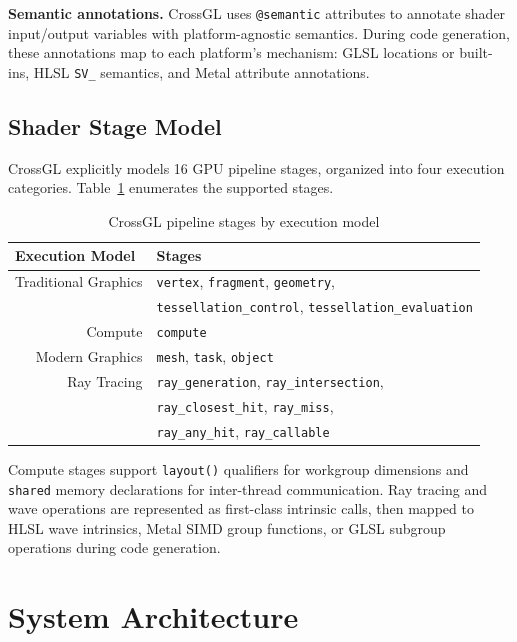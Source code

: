 \documentclass{svproc}
\begin{document}
\textbf{Semantic annotations.} CrossGL uses \texttt{@semantic} attributes to annotate shader input/output variables with platform-agnostic semantics. During code generation, these annotations map to each platform's mechanism: GLSL locations or built-ins, HLSL \texttt{SV\_} semantics, and Metal attribute annotations.

\subsection{Shader Stage Model}

CrossGL explicitly models 16 GPU pipeline stages, organized into four execution categories. Table~\ref{tab:stages} enumerates the supported stages.

\begin{table}
\caption{CrossGL pipeline stages by execution model}
\label{tab:stages}
\begin{center}
\begin{tabular}{r@{\quad}l}
\hline
\multicolumn{1}{l}{\rule{0pt}{12pt}\textbf{Execution Model}} & \textbf{Stages} \\[2pt]
\hline\rule{0pt}{12pt}
Traditional Graphics & \texttt{vertex}, \texttt{fragment}, \texttt{geometry}, \\
& \texttt{tessellation\_control}, \texttt{tessellation\_evaluation} \\
Compute & \texttt{compute} \\
Modern Graphics & \texttt{mesh}, \texttt{task}, \texttt{object} \\
Ray Tracing & \texttt{ray\_generation}, \texttt{ray\_intersection}, \\
& \texttt{ray\_closest\_hit}, \texttt{ray\_miss}, \\
& \texttt{ray\_any\_hit}, \texttt{ray\_callable} \\[2pt]
\hline
\end{tabular}
\end{center}
\end{table}

Compute stages support \texttt{layout()} qualifiers for workgroup dimensions and \texttt{shared} memory declarations for inter-thread communication. Ray tracing and wave operations are represented as first-class intrinsic calls, then mapped to HLSL wave intrinsics, Metal SIMD group functions, or GLSL subgroup operations during code generation.

\section{System Architecture}
\end{document}
